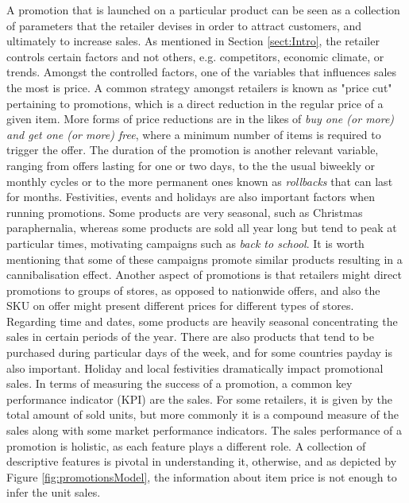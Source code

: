 \documentclass{ieeeaccess}
\begin{document}
A promotion that is launched on a particular product can be seen as a collection of parameters that the retailer devises in order to attract customers, and ultimately to increase sales. As mentioned in Section \ref{sect:Intro}, the retailer controls certain factors and not others, e.g. competitors, economic climate, or trends. Amongst the controlled factors, one of the variables that influences sales the most is price. A common strategy amongst retailers is known as "price cut" pertaining to promotions, which is a direct reduction in the regular price of a given item. More forms of price reductions are in the likes of \textit{buy one (or more) and get one (or more) free}, where a minimum number of items is required to trigger the offer. The duration of the promotion is another relevant variable, ranging from offers lasting for one or two days, to the the usual biweekly or monthly cycles or to the more permanent ones known as \textit{rollbacks} that can last for months. Festivities, events and holidays are also important factors when running promotions. Some products are very seasonal, such as Christmas paraphernalia, whereas some products are sold all year long but tend to peak at particular times,  motivating campaigns such as \textit{back to school}. It is worth mentioning that some of these campaigns promote similar products resulting in a cannibalisation effect. Another aspect of promotions is that retailers might direct promotions to groups of stores, as opposed to nationwide offers, and also the SKU on offer might present different prices for different types of stores. Regarding time and dates, some products are heavily seasonal concentrating the sales in certain periods of the year. There are also products that tend to be purchased during particular days of the week, and for some countries payday is also important. Holiday and local festivities dramatically impact promotional sales. In terms of measuring the success of a promotion, a common key performance indicator (KPI) are the sales. For some retailers, it is given by the total amount of sold units, but more commonly it is a compound measure of the sales along with some market performance indicators. The sales performance of a promotion is holistic, as each feature plays a different role. A collection of descriptive features is pivotal in understanding it, otherwise, and as depicted by Figure \ref{fig:promotionsModel}, the information about item price is not enough to infer the unit sales.



\end{document}
